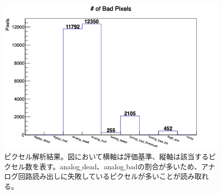 \begin{figure}[bpt]\centering
\includegraphics[width=12cm]{./data/analysis_result/Bad_Pixels.png}
\caption[ピクセル解析結果]{ピクセル解析結果。図において横軸は評価基準、縦軸は該当するピクセル数を表す。analog$\_$dead、analog$\_$badの割合が多いため、アナログ回路読み出しに失敗しているピクセルが多いことが読み取れる。}
\label{pixel_analysis_result}
\end{figure}

